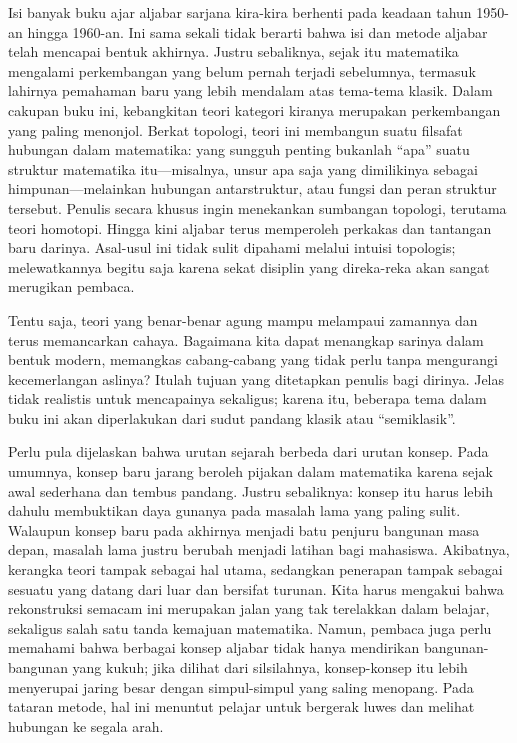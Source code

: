 Isi banyak buku ajar aljabar sarjana kira-kira berhenti pada keadaan tahun 1950-an hingga 1960-an. Ini sama sekali tidak berarti bahwa isi dan metode aljabar telah mencapai bentuk akhirnya. Justru sebaliknya, sejak itu matematika mengalami perkembangan yang belum pernah terjadi sebelumnya, termasuk lahirnya pemahaman baru yang lebih mendalam atas tema-tema klasik. Dalam cakupan buku ini, kebangkitan teori kategori kiranya merupakan perkembangan yang paling menonjol. Berkat topologi, teori ini membangun suatu filsafat hubungan dalam matematika: yang sungguh penting bukanlah ``apa'' suatu struktur matematika itu—misalnya, unsur apa saja yang dimilikinya sebagai himpunan—melainkan hubungan antarstruktur, atau fungsi dan peran struktur tersebut. Penulis secara khusus ingin menekankan sumbangan topologi, terutama teori homotopi. Hingga kini aljabar terus memperoleh perkakas dan tantangan baru darinya. Asal-usul ini tidak sulit dipahami melalui intuisi topologis; melewatkannya begitu saja karena sekat disiplin yang direka-reka akan sangat merugikan pembaca.

Tentu saja, teori yang benar-benar agung mampu melampaui zamannya dan terus memancarkan cahaya. Bagaimana kita dapat menangkap sarinya dalam bentuk modern, memangkas cabang-cabang yang tidak perlu tanpa mengurangi kecemerlangan aslinya? Itulah tujuan yang ditetapkan penulis bagi dirinya. Jelas tidak realistis untuk mencapainya sekaligus; karena itu, beberapa tema dalam buku ini akan diperlakukan dari sudut pandang klasik atau ``semiklasik''.

Perlu pula dijelaskan bahwa urutan sejarah berbeda dari urutan konsep. Pada umumnya, konsep baru jarang beroleh pijakan dalam matematika karena sejak awal sederhana dan tembus pandang. Justru sebaliknya: konsep itu harus lebih dahulu membuktikan daya gunanya pada masalah lama yang paling sulit. Walaupun konsep baru pada akhirnya menjadi batu penjuru bangunan masa depan, masalah lama justru berubah menjadi latihan bagi mahasiswa. Akibatnya, kerangka teori tampak sebagai hal utama, sedangkan penerapan tampak sebagai sesuatu yang datang dari luar dan bersifat turunan. Kita harus mengakui bahwa rekonstruksi semacam ini merupakan jalan yang tak terelakkan dalam belajar, sekaligus salah satu tanda kemajuan matematika. Namun, pembaca juga perlu memahami bahwa berbagai konsep aljabar tidak hanya mendirikan bangunan-bangunan yang kukuh; jika dilihat dari silsilahnya, konsep-konsep itu lebih menyerupai jaring besar dengan simpul-simpul yang saling menopang. Pada tataran metode, hal ini menuntut pelajar untuk bergerak luwes dan melihat hubungan ke segala arah.

